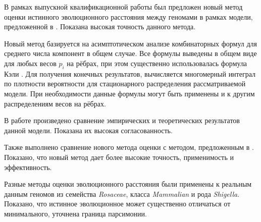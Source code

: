 \startconclusionpage

В рамках выпускной квалификационной работы был предложен новый метод оценки истинного эволюционного расстояния между геномами в рамках модели, предложенной в \cite{fr-4}.
Показана высокая точность данного метода.

Новый метод базируется на асимптотическом анализе комбинаторных формул для среднего числа компонент в общем случае.
Все формулы выведены в общем виде для любых весов $p_i$ на рёбрах, при этом существенно использовалась формула Кэли \cite{cayley}.
Для получения конечных результатов, вычисляется многомерный интеграл по плотности вероятности для стационарного распределения рассматриваемой модели.
При необходимости данные формулы могут быть применены и к другим распределениям весов на рёбрах.

В работе произведено сравнение эмпирических и теоретических результатов данной модели.
Показана их высокая согласованность.

Также выполнено сравнение нового метода оценки с методом, предложенным в \cite{fr-4}. 
Показано, что новый метод дает более высокие точность, применимость и эффективность.

Разные методы оценки эволюционного расстояния были применены к реальным  данным геномов из семейства \emph{Rosaceae}, класса \emph{Mammalian} и рода \emph{Shigella}.
Показано, что истинное эволюционное может существенно отличаться от минимального, уточнена граница парсимонии.
